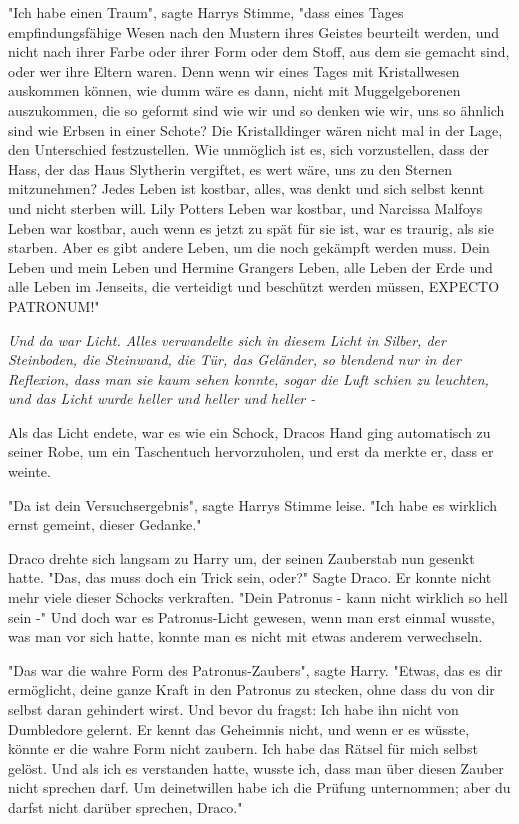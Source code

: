 {"Ich habe einen Traum", sagte Harrys Stimme, "dass eines Tages empfindungsfähige Wesen nach den Mustern ihres Geistes beurteilt werden, und nicht nach ihrer Farbe oder ihrer Form oder dem Stoff, aus dem sie gemacht sind, oder wer ihre Eltern waren. Denn wenn wir eines Tages mit Kristallwesen auskommen können, wie dumm wäre es dann, nicht mit Muggelgeborenen auszukommen, die so geformt sind wie wir und so denken wie wir, uns so ähnlich sind wie Erbsen in einer Schote? Die Kristalldinger wären nicht mal in der Lage, den Unterschied festzustellen. Wie unmöglich ist es, sich vorzustellen, dass der Hass, der das Haus Slytherin vergiftet, es wert wäre, uns zu den Sternen mitzunehmen? Jedes Leben ist kostbar, alles, was denkt und sich selbst kennt und nicht sterben will. Lily Potters Leben war kostbar, und Narcissa Malfoys Leben war kostbar, auch wenn es jetzt zu spät für sie ist, war es traurig, als sie starben. Aber es gibt andere Leben, um die noch gekämpft werden muss. Dein Leben und mein Leben und Hermine Grangers Leben, alle Leben der Erde und alle Leben im Jenseits, die verteidigt und beschützt werden müssen, EXPECTO PATRONUM!"

\emph{Und da war Licht. Alles verwandelte sich in diesem Licht in Silber, der Steinboden, die Steinwand, die Tür, das Geländer, so blendend nur in der Reflexion, dass man sie kaum sehen konnte, sogar die Luft schien zu leuchten, und das Licht wurde heller und heller und heller -}

Als das Licht endete, war es wie ein Schock, Dracos Hand ging automatisch zu seiner Robe, um ein Taschentuch hervorzuholen, und erst da merkte er, dass er weinte.

"Da ist dein Versuchsergebnis", sagte Harrys Stimme leise. "Ich habe es wirklich ernst gemeint, dieser Gedanke."

Draco drehte sich langsam zu Harry um, der seinen Zauberstab nun gesenkt hatte. "Das, das muss doch ein Trick sein, oder?" Sagte Draco. Er konnte nicht mehr viele dieser Schocks verkraften. "Dein Patronus - kann nicht wirklich so hell sein -" Und doch war es Patronus-Licht gewesen, wenn man erst einmal wusste, was man vor sich hatte, konnte man es nicht mit etwas anderem verwechseln.

"Das war die wahre Form des Patronus-Zaubers", sagte Harry. "Etwas, das es dir ermöglicht, deine ganze Kraft in den Patronus zu stecken, ohne dass du von dir selbst daran gehindert wirst. Und bevor du fragst: Ich habe ihn nicht von Dumbledore gelernt. Er kennt das Geheimnis nicht, und wenn er es wüsste, könnte er die wahre Form nicht zaubern. Ich habe das Rätsel für mich selbst gelöst. Und als ich es verstanden hatte, wusste ich, dass man über diesen Zauber nicht sprechen darf. Um deinetwillen habe ich die Prüfung unternommen; aber du darfst nicht darüber sprechen, Draco."

}
